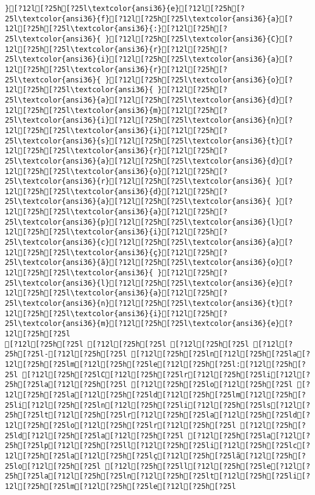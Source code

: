 \documentclass{scrartcl}
\begin{document}
\begin{Verbatim}
}[?12l[?25h[?25l\textcolor{ansi36}{e}[?12l[?25h[?25l\textcolor{ansi36}{f}[?12l[?25h[?25l\textcolor{ansi36}{a}[?12l[?25h[?25l\textcolor{ansi36}{:}[?12l[?25h[?25l\textcolor{ansi36}{ }[?12l[?25h[?25l\textcolor{ansi36}{C}[?12l[?25h[?25l\textcolor{ansi36}{r}[?12l[?25h[?25l\textcolor{ansi36}{i}[?12l[?25h[?25l\textcolor{ansi36}{a}[?12l[?25h[?25l\textcolor{ansi36}{r}[?12l[?25h[?25l\textcolor{ansi36}{ }[?12l[?25h[?25l\textcolor{ansi36}{o}[?12l[?25h[?25l\textcolor{ansi36}{ }[?12l[?25h[?25l\textcolor{ansi36}{a}[?12l[?25h[?25l\textcolor{ansi36}{d}[?12l[?25h[?25l\textcolor{ansi36}{m}[?12l[?25h[?25l\textcolor{ansi36}{i}[?12l[?25h[?25l\textcolor{ansi36}{n}[?12l[?25h[?25l\textcolor{ansi36}{i}[?12l[?25h[?25l\textcolor{ansi36}{s}[?12l[?25h[?25l\textcolor{ansi36}{t}[?12l[?25h[?25l\textcolor{ansi36}{r}[?12l[?25h[?25l\textcolor{ansi36}{a}[?12l[?25h[?25l\textcolor{ansi36}{d}[?12l[?25h[?25l\textcolor{ansi36}{o}[?12l[?25h[?25l\textcolor{ansi36}{r}[?12l[?25h[?25l\textcolor{ansi36}{ }[?12l[?25h[?25l\textcolor{ansi36}{d}[?12l[?25h[?25l\textcolor{ansi36}{a}[?12l[?25h[?25l\textcolor{ansi36}{ }[?12l[?25h[?25l\textcolor{ansi36}{a}[?12l[?25h[?25l\textcolor{ansi36}{p}[?12l[?25h[?25l\textcolor{ansi36}{l}[?12l[?25h[?25l\textcolor{ansi36}{i}[?12l[?25h[?25l\textcolor{ansi36}{c}[?12l[?25h[?25l\textcolor{ansi36}{a}[?12l[?25h[?25l\textcolor{ansi36}{ç}[?12l[?25h[?25l\textcolor{ansi36}{ã}[?12l[?25h[?25l\textcolor{ansi36}{o}[?12l[?25h[?25l\textcolor{ansi36}{ }[?12l[?25h[?25l\textcolor{ansi36}{l}[?12l[?25h[?25l\textcolor{ansi36}{e}[?12l[?25h[?25l\textcolor{ansi36}{a}[?12l[?25h[?25l\textcolor{ansi36}{n}[?12l[?25h[?25l\textcolor{ansi36}{t}[?12l[?25h[?25l\textcolor{ansi36}{i}[?12l[?25h[?25l\textcolor{ansi36}{m}[?12l[?25h[?25l\textcolor{ansi36}{e}[?12l[?25h[?25l
[?12l[?25h[?25l [?12l[?25h[?25l [?12l[?25h[?25l [?12l[?25h[?25l-[?12l[?25h[?25l [?12l[?25h[?25ln[?12l[?25h[?25la[?12l[?25h[?25lm[?12l[?25h[?25le[?12l[?25h[?25l:[?12l[?25h[?25l [?12l[?25h[?25lC[?12l[?25h[?25lr[?12l[?25h[?25li[?12l[?25h[?25la[?12l[?25h[?25l [?12l[?25h[?25lo[?12l[?25h[?25l [?12l[?25h[?25la[?12l[?25h[?25ld[?12l[?25h[?25lm[?12l[?25h[?25li[?12l[?25h[?25ln[?12l[?25h[?25li[?12l[?25h[?25ls[?12l[?25h[?25lt[?12l[?25h[?25lr[?12l[?25h[?25la[?12l[?25h[?25ld[?12l[?25h[?25lo[?12l[?25h[?25lr[?12l[?25h[?25l [?12l[?25h[?25ld[?12l[?25h[?25la[?12l[?25h[?25l [?12l[?25h[?25la[?12l[?25h[?25lp[?12l[?25h[?25ll[?12l[?25h[?25li[?12l[?25h[?25lc[?12l[?25h[?25la[?12l[?25h[?25lç[?12l[?25h[?25lã[?12l[?25h[?25lo[?12l[?25h[?25l [?12l[?25h[?25ll[?12l[?25h[?25le[?12l[?25h[?25la[?12l[?25h[?25ln[?12l[?25h[?25lt[?12l[?25h[?25li[?12l[?25h[?25lm[?12l[?25h[?25le[?12l[?25h[?25l

\end{Verbatim}
\end{document}
